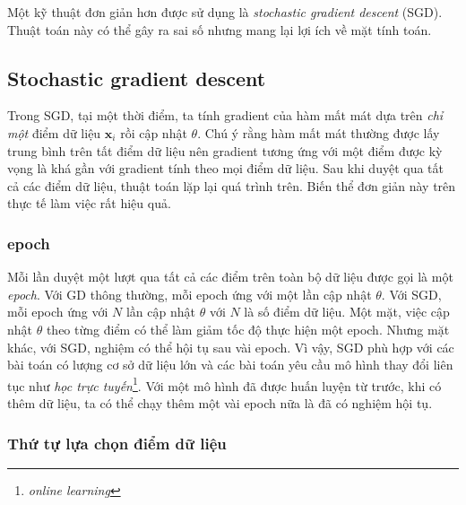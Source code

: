 Một kỹ thuật đơn giản hơn được sử dụng là \textit{stochastic gradient descent}
(SGD). Thuật toán này có thể gây ra sai số nhưng mang lại lợi ích về mặt tính
toán.


\subsection{Stochastic gradient descent}
Trong SGD, tại một thời điểm, ta tính gradient của hàm
mất mát dựa trên \textit{chỉ một} điểm dữ liệu $\mathbf{x}_i$ rồi cập nhật
$\theta$. Chú ý rằng hàm mất mát thường được lấy trung bình
trên tất điểm dữ liệu nên gradient tương ứng với một điểm {được kỳ vọng} là khá
gần với gradient tính theo mọi điểm dữ liệu. Sau khi duyệt qua tất cả
các điểm dữ liệu, thuật toán lặp lại quá trình trên. Biến thể đơn giản này trên
thực tế làm việc rất hiệu quả.


\subsubsection{epoch}
Mỗi lần duyệt một lượt qua {tất cả} các điểm trên toàn bộ dữ liệu được gọi là
một \textit{epoch}. Với GD thông thường, mỗi epoch ứng với một lần cập nhật
$\theta$. Với SGD, mỗi epoch ứng với $N$ lần cập nhật $\theta$ với $N$ là số
điểm dữ liệu. Một mặt, việc cập nhật $\theta$ theo từng điểm có thể làm giảm tốc
độ thực hiện một epoch. Nhưng mặt khác, với SGD, nghiệm có thể hội tụ sau vài
epoch. Vì vậy, SGD phù hợp với các bài toán có lượng cơ sở dữ liệu lớn và các
bài toán yêu cầu mô hình thay đổi liên tục như \textit{học trực
tuyến}\footnote{\textit{online learning}}. Với một mô hình đã được huấn luyện từ
trước, khi có thêm dữ liệu, ta có thể chạy thêm một vài epoch nữa là đã có
nghiệm hội tụ.

\subsubsection{Thứ tự lựa chọn điểm dữ liệu}

